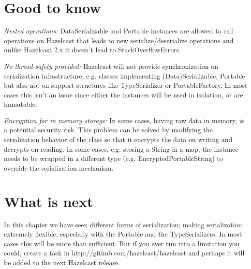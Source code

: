 \section{Good to know}

\emph{Nested operations:} DataSerializable and Portable instances are allowed to call operations on Hazelcast that leads to new serialize/deserialize operations and unlike Hazelcast 2.x it doesn't lead to StackOverflowErrors.

\emph{No thread-safety provided:} Hazelcast will not provide synchronization on serialization infrastructure, e.g. classes implementing (Data)Serializable, Portable but also not on support structures like TypeSerializer or PortableFactory. In most cases this isn't an issue since either the instances will be used in isolation, or are immutable.

\emph{Encryption for in memory storage:} In some cases, having raw data in memory, is a potential security risk. This problem can be solved by modifying the serialization behavior of the class so that it encrypts the data on writing and decrypts on reading. In some cases, e.g. storing a String in a map, the instance needs to be wrapped in a different type (e.g. EncryptedPortableString) to override the serialization mechanism.

\section{What is next}
In this chapter we have seen different forms of serialization; making serialization extremely flexible, especially with the Portable and the TypeSerializers. In most cases this will be more than sufficient. But if you ever run into a limitation you could, create a task in http://github.com/hazelcast/hazelcast and perhaps it will be added to the next Hazelcast release.